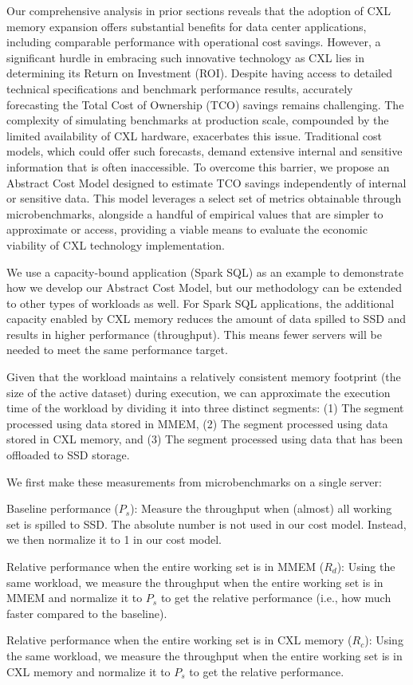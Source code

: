 Our comprehensive analysis in prior sections reveals that the adoption of CXL memory expansion offers substantial benefits for data center applications, including comparable performance with operational cost savings. However, a significant hurdle in embracing such innovative technology as CXL lies in determining its Return on Investment (ROI). Despite having access to detailed technical specifications and benchmark performance results, accurately forecasting the Total Cost of Ownership (TCO) savings remains challenging. The complexity of simulating benchmarks at production scale, compounded by the limited availability of CXL hardware, exacerbates this issue. Traditional cost models, which could offer such forecasts, demand extensive internal and sensitive information that is often inaccessible. To overcome this barrier, we propose an Abstract Cost Model designed to estimate TCO savings independently of internal or sensitive data. This model leverages a select set of metrics obtainable through microbenchmarks, alongside a handful of empirical values that are simpler to approximate or access, providing a viable means to evaluate the economic viability of CXL technology implementation.

We use a capacity-bound application (Spark SQL) as an example to demonstrate how we develop our Abstract Cost Model, but our methodology can be extended to other types of workloads as well. For Spark SQL applications, the additional capacity enabled by CXL memory reduces the amount of data spilled to SSD and results in higher performance (throughput). This means fewer servers will be needed to meet the same performance target.

Given that the workload maintains a relatively consistent memory footprint (the size of the active dataset) during execution, we can approximate the execution time of the workload by dividing it into three distinct segments: (1) The segment processed using data stored in MMEM, (2) The segment processed using data stored in CXL memory, and (3) The segment processed using data that has been offloaded to SSD storage.

We first make these measurements from microbenchmarks on a single server:
\begin{icompact}
  \item Baseline performance ($P_s$):
  Measure the throughput when (almost) all working set is spilled to SSD. The absolute number is not used in our cost model. Instead, we then normalize it to 1 in our cost model.
  \item Relative performance when the entire working set is in MMEM ($R_d$): Using the same workload, we measure the throughput when the entire working set is in MMEM and normalize it to $P_s$ to get the relative performance (i.e., how much faster compared to the baseline).
  \item Relative performance when the entire working set is in CXL memory ($R_c$): Using the same workload, we measure the throughput when the entire working set is in CXL memory and normalize it to $P_s$ to get the relative performance.
\end{icompact}

